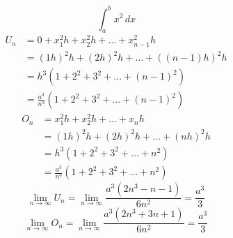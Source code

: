 \begin{equation}
    \int_a^b x^2\,dx
\end{equation}
\begin{equation}
    \begin{aligned}
        U_n &= 0 + x_1^2h + x_2^2h + \ldots + x_{n-1}^2h \\
          & = (1h)^2h + (2h)^2h + \ldots + ((n-1)h)^2h \\
          & = h^3(1+2^2+3^2+\ldots+(n-1)^2) \\
          & = \frac{a^3}{n^3}(1+2^2+3^2+\ldots+(n-1)^2)
    \end{aligned}
\end{equation}
\begin{equation}
    \begin{aligned}
        O_n &= x_1^2h + x_2^2h + \ldots + x_nh \\
          & = (1h)^2h + (2h)^2h + \ldots + (nh)^2h \\
          & = h^3(1+2^2+3^2+\ldots+n^2) \\
          & = \frac{a^3}{n^3}(1+2^2+3^2+\ldots+n^2)
    \end{aligned}
\end{equation}
\begin{equation}
    \lim\limits_{n\to\infty} U_n = \lim\limits_{n\to\infty} \frac{a^3\left(2n^3-n-1\right)}{6n^2} = \frac{a^3}{3}
\end{equation}
\begin{equation}
    \lim\limits_{n\to\infty} O_n = \lim\limits_{n\to\infty} \frac{a^3\left(2n^3+3n+1\right)}{6n^2} = \frac{a^3}{3}
\end{equation}
